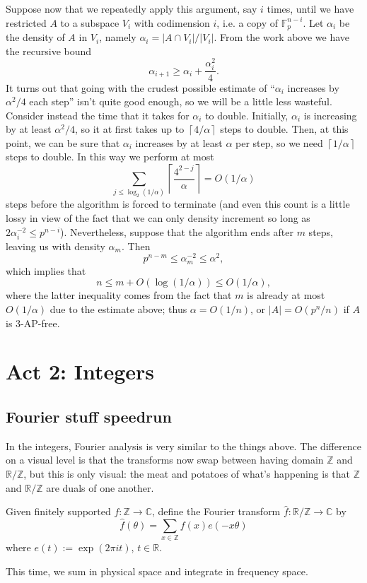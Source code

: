 \documentclass[10pt]{scrartcl}
\providecommand{\CC}{\mathbb C}
\providecommand{\FF}{\mathbb F}
\providecommand{\RR}{\mathbb R}
\providecommand{\ZZ}{\mathbb Z}
\renewcommand{\hat}{\widehat}
\providecommand{\ceil}[1]{\left\lceil #1\right\rceil}
\begin{document}
Suppose now that we repeatedly apply this argument, say $i$ times,
until we have restricted $A$ to a subspace $V_i$ with codimension $i$,
i.e. a copy of $\FF_p^{n-i}$. Let $\alpha_i$ be the density of $A$ in $V_i$,
namely $\alpha_i = |A\cap V_i|/|V_i|$.
From the work above we have the recursive bound
\[\alpha_{i+1}\ge \alpha_i+\frac{\alpha_i^2}{4}.\]
It turns out that going with the crudest possible estimate of
``$\alpha_i$ increases by $\alpha^2/4$ each step'' isn't quite good enough,
so we will be a little less wasteful. Consider instead the time that it takes
for $\alpha_i$ to double. Initially, $\alpha_i$
is increasing by at least $\alpha^2/4$, so it at first takes up to
$\ceil{4/\alpha}$ steps to double. Then, at this point, we can be sure
that $\alpha_i$ increases by at least $\alpha$ per step, so
we need $\ceil{1/\alpha}$ steps to double. In this way we perform at most
\[\sum_{j\le\log_2(1/\alpha)} \ceil{\frac{4^{2-j}}{\alpha}} = O(1/\alpha)\]
steps before the algorithm is forced to terminate
(and even this count is a little lossy in view of the fact that
we can only density increment so long as $2\alpha_i^{-2}\le p^{n-i}$).
Nevertheless, suppose that the algorithm ends after $m$ steps,
leaving us with density $\alpha_m$. Then
\[p^{n-m}\le \alpha_m^{-2}\le\alpha^2,\]
which implies that
\[n\le m+O(\log(1/\alpha))\le O(1/\alpha),\]
where the latter inequality comes from the fact that $m$ is already
at most $O(1/\alpha)$ due to the estimate above;
thus $\alpha = O(1/n)$, or $|A| = O(p^n/n)$ if $A$ is 3-AP-free.
\pagebreak
\section{Act 2: Integers}
\subsection{Fourier stuff speedrun}
In the integers, Fourier analysis is very similar to the things above.
The difference on a visual level is that the transforms
now swap between having domain $\ZZ$ and $\RR/\ZZ$, but
this is only visual: the meat and potatoes of what's happening
is that $\ZZ$ and $\RR/\ZZ$ are duals of one another.
\begin{definition}[Fourier transform, $\ZZ$]
	Given finitely supported $f\colon\ZZ\to\CC$, define
	the Fourier transform $\hat f\colon\RR/\ZZ\to\CC$ by
	\[\hat f(\theta) = \sum_{x\in\ZZ} f(x)e(-x\theta)\]
	where $e(t) := \exp(2\pi it)$, $t\in\RR$.
\end{definition}
This time, we sum in physical space and integrate in frequency space.
\end{document}
